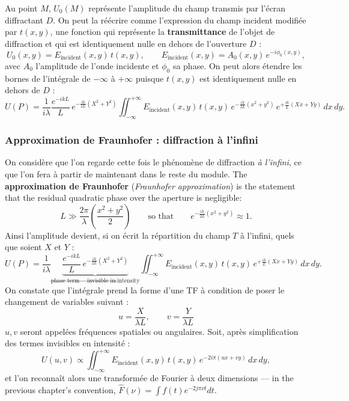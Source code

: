 Au point $M$, $U_0(M)$ représente l'amplitude du champ transmis par l'écran
diffractant $D$. On peut la réécrire comme l'expression du champ incident
modifiée par $t(x,y)$, une fonction qui représente la \textbf{transmittance} de
l'objet de diffraction et qui est identiquement nulle en dehors de
l'ouverture $D$ :
\begin{equation*}
  U_0(x,y) = E_{\text{incident}}(x,y)\, t(x,y),
  \qquad
  E_{\text{incident}}(x,y) = A_0(x,y)\, e^{-i\phi_0(x,y)} ,
\end{equation*}
avec $A_0$ l'amplitude de l'onde incidente et $\phi_0$ sa phase. On peut alors
étendre les bornes de l'intégrale de $-\infty$ à $+\infty$ puisque $t(x,y)$ est
identiquement nulle en dehors de $D$ :
\begin{equation*}
  U(P) = \frac{1}{i\lambda}\frac{e^{-ikL}}{L}\, e^{-\frac{ik}{2L}(X^2+Y^2)}
  \iint_{-\infty}^{+\infty} E_{\text{incident}}(x,y)\, t(x,y)\,
  e^{-\frac{ik}{2L}(x^2+y^2)}\, e^{+\frac{ik}{L}(Xx+Yy)}\, dx\,dy .
\end{equation*}

\subsubsection{Approximation de Fraunhofer : diffraction à l'infini}
On considère que l'on regarde cette fois le phénomène de diffraction
\emph{à l'infini}, ce que l'on fera à partir de maintenant dans le reste du
module. The \textbf{approximation de Fraunhofer} (\textit{Fraunhofer
approximation}) is the statement that the residual quadratic phase over the
aperture is negligible:
\begin{equation*}
  L \gg \frac{2\pi}{\lambda}\left(\frac{x^2+y^2}{2}\right)
  \qquad\text{so that}\qquad
  e^{-\frac{ik}{2L}(x^2+y^2)} \approx 1 .
\end{equation*}
Ainsi l'amplitude devient, si on écrit la répartition du champ $T$ à l'infini,
quels que soient $X$ et $Y$ :
\begin{equation*}
  U(P) = \frac{1}{i\lambda}
  \underbrace{\frac{e^{-ikL}}{L}\, e^{-\frac{ik}{2L}(X^2+Y^2)}}
             _{\text{phase term} \,\to\, \text{invisible in intensity}}
  \iint_{-\infty}^{+\infty} E_{\text{incident}}(x,y)\, t(x,y)\,
  e^{+\frac{ik}{L}(Xx+Yy)}\, dx\,dy .
\end{equation*}
On constate que l'intégrale prend la forme d'une TF à condition de poser le
changement de variables suivant :
\begin{equation*}
  \boxed{\; u = \frac{X}{\lambda L}, \qquad v = \frac{Y}{\lambda L} \;}
\end{equation*}
$u,v$ seront appelées fréquences spatiales ou angulaires. Soit, après
simplification des termes invisibles en intensité :
\begin{equation*}
  U(u,v) \propto \iint_{-\infty}^{+\infty}
  E_{\text{incident}}(x,y)\, t(x,y)\, e^{-2i\pi(ux+vy)}\, dx\,dy ,
\end{equation*}
et l'on reconnaît alors une transformée de Fourier à deux dimensions --- in the
previous chapter's convention, $\hat{F}(\nu) = \int f(t)e^{-2j\pi\nu t}dt$.

